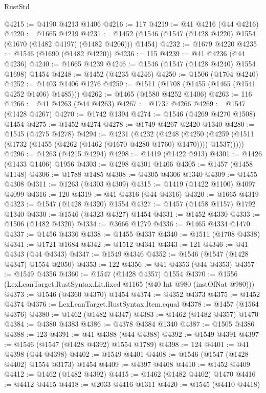 \begin{lexlean}{RustStd}
\begin{coremodule}
{\begin{coremodule}
{{{{{{{{{{{{{{{{{{{{{{{{{{{{{{@4215 := @4190 @4213 @1406
@4216 := 117
@4219 := @41 @4216 (@44 @4216)
@4220 := @1665 @4219
@4231 := @1452 (@1546 (@1547 (@1428 @4220) @1554 (@1670 (@1482 @4197) (@1482 @4206))) @1454)
@4232 := @1679 @4220
@4235 := @1546 (@1690 (@1482 @4220))
@4236 := 115
@4239 := @41 @4236 (@44 @4236)
@4240 := @1665 @4239
@4246 := @1546 (@1547 (@1428 @4240) @1554 @1698) @1454
@4248 := @1452 (@4235 @4246)
@4250 := @1506 (@1704 @4240)
@4252 := @1403 @1406 @1276
@4259 := @1511 (@1708 (@1455 (@1465 (@1541 @4252 @1406) @1485)))
@4262 := @1465 (@1580 @4252 @1406)
@4263 := 116
@4266 := @41 @4263 (@44 @4263)
@4267 := @1737 @4266
@4269 := @1547 (@1428 @4267)
@4270 := @1742 @1394
@4274 := @1546 (@4269 @4270 @1508) @1454
@4275 := @1452 @4274
@4278 := @1749 @4267 @2420 @1340
@4280 := @1545 (@4275 @4278)
@4294 := @4231
    (@4232
      (@4248
        (@4250 (@4259 (@1511 (@1732 (@1455 (@4262 (@1462 (@1670 @4280 @1760) @1470)))) @1537)))))
@4296 := @1263 (@4215 @4294)
@4298 := @1419 (@1422 @913)
@4301 := @1426 (@1433 @1406) @1956
@4303 := @4298 @4301 @1406
@4305 := @1457 (@1458 @1148)
@4306 := @1788 @1485
@4308 := @4305 @4306 @1340
@4309 := @1455 @4308
@4311 := @1263 (@4303 @4309)
@4315 := @1419 (@1422 @1100) @4097 @4099
@4316 := 120
@4319 := @41 @4316 (@44 @4316)
@4320 := @1665 @4319
@4323 := @1547 (@1428 @4320) @1554
@4327 := @1457 (@1458 @1157) @1792 @1340
@4330 := @1546 (@4323 @4327) @1454
@4331 := @1452 @4330
@4333 := @1506 (@1482 @4320)
@4334 := @3666 @1279
@4336 := @1465 @4334 @1470
@4337 := @1456 @4336
@4338 := @1455 @4337
@4340 := @1511 (@1708 @4338)
@4341 := @1721 @1684
@4342 := @1512 @4341
@4343 := 121
@4346 := @41 @4343 (@44 @4343)
@4347 := @1549 @4346
@4352 := @1546 (@1547 (@1428 @4347) @1554 @2050)
@4353 := 122
@4356 := @41 @4353 (@44 @4353)
@4357 := @1549 @4356
@4360 := @1547 (@1428 @4357) @1554
@4370 := @1556 (LexLeanTarget.RustSyntax.Lit.fixed @1165 (@40 Int @980 (instOfNat @980)))
@4373 := @1546 (@4360 @4370) @1454
@4374 := @4352 @4373
@4375 := @1452 @4374
@4376 := LexLeanTarget.RustSyntax.Item.equal
@4378 := @1457 (@1564 @4376)
@4380 := @1462 (@1482 @4347)
@4383 := @1462 (@1482 @4357) @1470
@4384 := @4380 @4383
@4386 := @4378 @4384 @1340
@4387 := @1505 @4386
@4388 := 123
@4391 := @41 @4388 (@44 @4388)
@4392 := @1549 @4391
@4397 := @1546 (@1547 (@1428 @4392) @1554 @1789)
@4398 := 124
@4401 := @41 @4398 (@44 @4398)
@4402 := @1549 @4401
@4408 := @1546 (@1547 (@1428 @4402) @1554 @3173) @1454
@4409 := @4397 @4408
@4410 := @1452 @4409
@4412 := @1462 (@1482 @4392)
@4415 := @1462 (@1482 @4402) @1470
@4416 := @4412 @4415
@4418 := @2033 @4416 @1311
@4420 := @1545 (@4410 @4418)
}}}}}}}}}}}}}}}}}}}}}}}}}}}}}}
\end{coremodule}}
\end{coremodule}
\end{lexlean}
